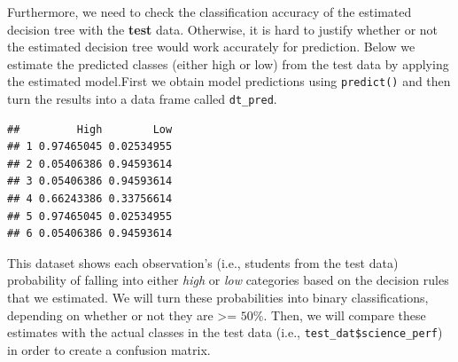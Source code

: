 \documentclass[]{book}
\newenvironment{Shaded}{\begin{snugshade}}{\end{snugshade}}
\newcommand{\DataTypeTok}[1]{\textcolor[rgb]{0.13,0.29,0.53}{#1}}
\newcommand{\FloatTok}[1]{\textcolor[rgb]{0.00,0.00,0.81}{#1}}
\newcommand{\KeywordTok}[1]{\textcolor[rgb]{0.13,0.29,0.53}{\textbf{#1}}}
\newcommand{\NormalTok}[1]{#1}
\newcommand{\OperatorTok}[1]{\textcolor[rgb]{0.81,0.36,0.00}{\textbf{#1}}}
\newcommand{\StringTok}[1]{\textcolor[rgb]{0.31,0.60,0.02}{#1}}
\begin{document}
Furthermore, we need to check the classification accuracy of the estimated decision tree with the \textbf{test} data. Otherwise, it is hard to justify whether or not the estimated decision tree would work accurately for prediction. Below we estimate the predicted classes (either high or low) from the test data by applying the estimated model.First we obtain model predictions using \texttt{predict()} and then turn the results into a data frame called \texttt{dt\_pred}.

\begin{Shaded}
\end{Shaded}

\begin{verbatim}
##         High        Low
## 1 0.97465045 0.02534955
## 2 0.05406386 0.94593614
## 3 0.05406386 0.94593614
## 4 0.66243386 0.33756614
## 5 0.97465045 0.02534955
## 6 0.05406386 0.94593614
\end{verbatim}

This dataset shows each observation's (i.e., students from the test data) probability of falling into either \emph{high} or \emph{low} categories based on the decision rules that we estimated. We will turn these probabilities into binary classifications, depending on whether or not they are \textgreater{}= \(50\%\). Then, we will compare these estimates with the actual classes in the test data (i.e., \texttt{test\_dat\$science\_perf}) in order to create a confusion matrix.

\begin{Shaded}
\end{Shaded}
\end{document}
